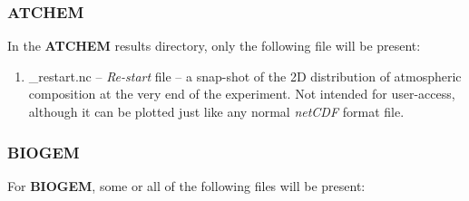 \documentclass[11pt,fleqn]{book} %
\begin{document}
\subsubsection{ATCHEM}

\noindent In the \textbf{ATCHEM} results directory, only the following file will be present:

\begin{enumerate}

\vspace{1mm}\item \textsf{\footnotesize *\_restart.nc} -- \textit{Re-start} file -- a snap-shot of the 2D distribution of atmospheric composition at the very end of the experiment. Not intended for user-access, although it can be plotted just like any normal \textit{netCDF} format file.

\end{enumerate}\vspace{2mm}

\subsubsection{BIOGEM}

\noindent For \textbf{BIOGEM}, some or all of the following files will be present:
\end{document}
